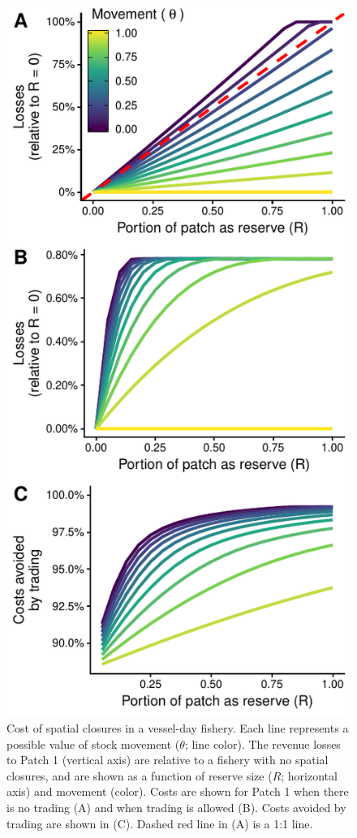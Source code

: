 \documentclass[12pt]{article}
\begin{document}
\begin{figure}[htbp]
\centering
\includegraphics{img/PNA_model.pdf}
\caption{\label{fig:PNA_model}Cost of spatial closures in a vessel-day fishery. Each line represents a possible value of stock movement ($\theta$; line color). The revenue losses to Patch 1 (vertical axis) are relative to a fishery with no spatial closures, and are shown as a function of reserve size ($R$; horizontal axis) and movement (color). Costs are shown for Patch 1 when there is no trading (A) and when trading is allowed (B). Costs avoided by trading are shown in (C). Dashed red line in (A) is a 1:1 line.}
\end{figure}
\end{document}
